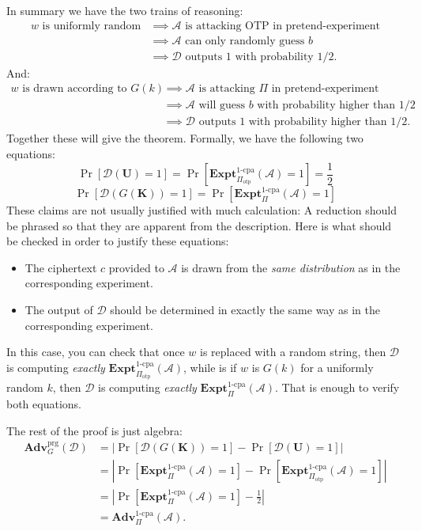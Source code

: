 \documentclass[11pt]{article}
\newcommand{\calD}{\mathcal{D}}
\newcommand{\calA}{\mathcal{A}}
\newcommand{\Adv}{\mathbf{Adv}}
\newcommand{\AdvPRG}[2]{\Adv^{\mathrm{prg}}_{#1}({#2})}
\newcommand{\bK}{\mathbf{K}}
\newcommand{\bU}{\mathbf{U}}
\newcommand{\ExptOTCPA}{\mathbf{Expt}^{\mathrm{1\mbox{-}cpa}}}
\newcommand{\AdvOTCPA}[2]{\Adv^{\mathrm{1\mbox{-}cpa}}_{#1}({#2})}
\newcommand{\Piotp}{\Pi_\mathrm{otp}}
\begin{document}
In summary we have the two trains of reasoning:
\begin{align*}
    \text{$w$ is uniformly random} 
    & \implies \text{$\calA$ is attacking OTP in pretend-experiment} \\
    & \implies \text{$\calA$ can only randomly guess $b$} \\
    & \implies \text{$\calD$ outputs $1$ with probability $1/2$}.
\end{align*}
And:
\begin{align*}
    \text{$w$ is drawn according to $G(k)$} 
    & \implies \text{$\calA$ is attacking $\Pi$ in pretend-experiment} \\
    & \implies \text{$\calA$ will guess $b$ with probability higher than $1/2$} \\
    & \implies \text{$\calD$ outputs $1$ with probability higher than $1/2$}.
\end{align*}
Together these will give the theorem.
Formally, we have the following two equations:
\[
    \Pr[\calD(\bU) = 1] = 
    \Pr[\ExptOTCPA_{\Piotp}(\calA) = 1] = \frac{1}{2}
\]
\[
    \Pr[\calD(G(\bK)) = 1] = 
    \Pr[\ExptOTCPA_\Pi(\calA) = 1]
\]
These claims are not usually justified with much calculation: A reduction
should be phrased so that they are apparent from the description. Here
is what should be checked in order to justify these equations:
\begin{itemize}

    \item The ciphertext $c$ provided to $\calA$ is drawn from the \emph{same
        distribution} as in the corresponding experiment.

    \item The output of $\calD$ should be determined in exactly the same way as
        in the corresponding experiment.

\end{itemize}
In this case, you can check that once $w$ is replaced with a random string,
then $\calD$ is computing \emph{exactly} $\ExptOTCPA_{\Piotp}(\calA)$,
while is if $w$ is $G(k)$ for a uniformly random $k$, then $\calD$
is computing \emph{exactly} $\ExptOTCPA_\Pi(\calA)$. That is enough
to verify both equations.

The rest of the proof is just algebra:
\begin{align*}
    \AdvPRG{G}{\calD} 
    & = \left|\Pr[\calD(G(\bK)) = 1] - \Pr[\calD(\bU) = 1]\right| \\
    & = \left|\Pr[\ExptOTCPA_\Pi(\calA) = 1]
    -  \Pr[\ExptOTCPA_{\Piotp}(\calA) = 1]\right| \\
    & = \left|\Pr[\ExptOTCPA_\Pi(\calA) = 1]
    -  \frac{1}{2}\right| \\
    & = \AdvOTCPA{\Pi}{\calA}. 
\end{align*}
\end{document}
